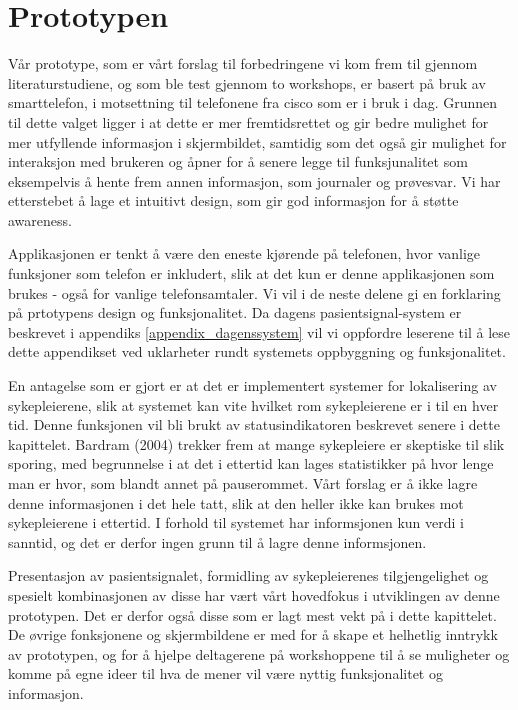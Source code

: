 \section{Prototypen}
\label{prototypen}

Vår prototype, som er vårt forslag til forbedringene vi kom frem til gjennom literaturstudiene, og som ble test gjennom to workshops, er basert på bruk av smarttelefon, i motsettning til telefonene fra cisco som er i bruk i dag. Grunnen til dette valget ligger i at dette er mer fremtidsrettet og gir bedre mulighet for mer utfyllende informasjon i skjermbildet, samtidig som det også gir mulighet for interaksjon med brukeren og åpner for å senere legge til funksjunalitet som eksempelvis å hente frem annen informasjon, som journaler og prøvesvar. Vi har etterstebet å lage et intuitivt design, som gir god informasjon for å støtte awareness.

\noindent
Applikasjonen er tenkt å være den eneste kjørende på telefonen, hvor vanlige funksjoner som telefon er inkludert, slik at det kun er denne applikasjonen som brukes - også for vanlige telefonsamtaler. Vi vil i de neste delene gi en forklaring på prtotypens design og funksjonalitet. Da dagens pasientsignal-system er beskrevet i appendiks \ref{appendix_dagenssystem} vil vi oppfordre leserene til å lese dette appendikset ved uklarheter rundt systemets oppbyggning og funksjonalitet.

\noindent
En antagelse som er gjort er at det er implementert systemer for lokalisering av sykepleierene, slik at systemet kan vite hvilket rom sykepleierene er i til en hver tid. Denne funksjonen vil bli brukt av statusindikatoren beskrevet senere i dette kapittelet. Bardram (2004) trekker frem at mange sykepleiere er skeptiske til slik sporing, med begrunnelse i at det i ettertid kan lages statistikker på hvor lenge man er hvor, som blandt annet på pauserommet. Vårt forslag er å ikke lagre denne informasjonen i det hele tatt, slik at den heller ikke kan brukes mot sykepleierene i ettertid. I forhold til systemet har informsjonen kun verdi i sanntid, og det er derfor ingen grunn til å lagre denne informsjonen.

\noindent
Presentasjon av pasientsignalet, formidling av sykepleierenes tilgjengelighet og spesielt kombinasjonen av disse har vært vårt hovedfokus i utviklingen av denne prototypen. Det er derfor også disse som er lagt mest vekt på i dette kapittelet. De øvrige fonksjonene og skjermbildene er med for å skape et helhetlig inntrykk av prototypen, og for å hjelpe deltagerene på workshoppene til å se muligheter og komme på egne ideer til hva de mener vil være nyttig funksjonalitet og informasjon.

